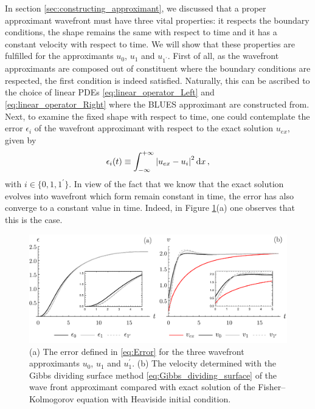 \documentclass[amsmath,amssymb,amsfonts,aps,pre,preprint,superscriptaddress,bibnotes,showpacs,showkeys,longbibliography]{revtex4-1}
\begin{document}
In section \ref{sec:constructing_approximant}, we discussed that a proper approximant wavefront must have three vital properties: it respects the boundary conditions, the shape remains the same with respect to time and it has a constant velocity with respect to time. We will show that these properties are fulfilled for the approximants $u_0$, $u_1$ and $u_{1^\prime}$. First of all, as the wavefront approximants are composed out of constituent where the boundary conditions are respected, the first condition is indeed satisfied. Naturally, this can be ascribed to the choice of linear PDEs \eqref{eq:linear_operator_Left} and \eqref{eq:linear_operator_Right} where the BLUES approximant are constructed from. Next, to examine the fixed shape with respect to time, one could contemplate the error $\epsilon_i$ of the wavefront approximant with respect to the exact solution $u_{ex}$, given by
\begin{align}\label{eq:Error}
    \epsilon_i(t) \equiv \int_{-\infty}^{+\infty}  \abs{u_{ex}-u_i}^2\dd{x},
\end{align}
with $i\in \{0,1,1^\prime \}$. In view of the fact that we know that the exact solution evolves into wavefront which form remain constant in time, the error has also converge to a constant value in time. Indeed, in Figure \ref{fig:ErrorVelocityGrid}(a) one observes that this is the case. 
\begin{figure}[!ht]
    \centering
    \includegraphics[width=\linewidth]{Figures/ErrorVelocityGrid.pdf}
    \caption{(a) The error defined in \eqref{eq:Error} for the three wavefront approximants $u_0$, $u_1$ and $u_1^\prime$. (b) The velocity determined with the Gibbs dividing surface method \eqref{eq:Gibbs_dividing_surface} of the wave front approximant compared with exact solution of the Fisher–Kolmogorov equation with Heaviside initial condition. }
    \label{fig:ErrorVelocityGrid}
\end{figure}
\end{document}
